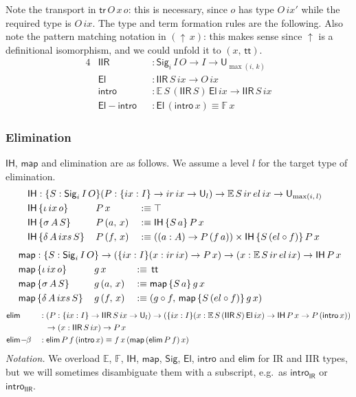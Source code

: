 \documentclass[acmsmall,screen,review]{acmart}
\newcommand{\msf}[1]{{\mathsf{#1}}}
\newcommand{\mbb}[1]{\mathbb{#1}}
\newcommand{\U}{\msf{U}}
\newcommand{\El}{\msf{El}}
\newcommand{\lup}{\uparrow}
\newcommand{\Sig}{\msf{Sig}}
\newcommand{\ttt}{\msf{tt}}
\newcommand{\ir}{{ir}}
\newcommand{\el}{{el}}
\newcommand{\ix}{{ix}}
\newcommand{\ixs}{{ixs}}
\newcommand{\IR}{\msf{IR}}
\newcommand{\intro}{\msf{intro}}
\newcommand{\IH}{\msf{IH}}
\newcommand{\map}{\msf{map}}
\newcommand{\elim}{\msf{elim}}
\newcommand{\tr}{\msf{tr}}
\newcommand{\IIR}{\msf{IIR}}
\newcommand{\E}{\mbb{E}}
\newcommand{\F}{\mbb{F}}
\begin{document}
Note the transport in $\tr\,O\,x\,o$: this is necessary, since $o$ has type $O\,\ix'$ while the
required type is $O\,\ix$. The type and term formation rules are the following. Also note the pattern matching notation
in $(\lup\,x)$: this makes sense since $\lup$ is a definitional isomorphism, and we could unfold it to $(x,\,\ttt)$.
\begin{alignat*}{4}
  &\IIR               && : \Sig_i\,I\,O \to I \to \U_{\max(i,\,k)}\\
  &\El                && : \IIR\,S\,\ix \to O\,\ix\\
  &\intro             && : \E\,S\,(\IIR\,S)\,\El\,\ix \to \IIR\,S\,\ix\\
  &\msf{El\!\!-\!\!intro} && : \El\,(\intro\,x) \equiv \F\,x
\end{alignat*}
\subsubsection{Elimination}\label{sec:iir-elimination} $\IH$, $\map$ and elimination are
as follows. We assume a level $l$ for the target type of elimination.
\begin{alignat*}{3}
  &\rlap{$\IH : \{S : \Sig_i\,I\,O\}(P : \{\ix : I\}\to \ir\,\ix \to \U_l) \to \E\,S\,\ir\,\el\,\ix \to \U_{\max(i,\,l)}$} \\
  &\IH\,\{\iota\,\ix\,o      \}\,&&P\,x       &&:\equiv \top \\
  &\IH\,\{\sigma\,A\,S     \}\,&&P\,(a,\,x) &&:\equiv \IH\,\{S\,a\}\,P\,x \\
  &\IH\,\{\delta\,A\,\ixs\,S\}\,&&P\,(f,\,x) &&:\equiv ((a : A) \to P\,(f\,a)) \times \IH\,\{S\,(\el \circ f)\}\,P\,x
\end{alignat*}
\begin{alignat*}{3}
  &\hspace{-7em}\rlap{$\map : \{S : \Sig_i\,I\,O\} \to (\{\ix : I\}(x : \ir\,\ix) \to P\,x) \to (x : \E\,S\,\ir\,\el\,\ix) \to \IH\,P\,x$} \\
  &\hspace{-7em}\map\,\{\iota\,\ix\,o\}\,&&g\,x       &&:\equiv\,\ttt \\
  &\hspace{-7em}\map\,\{\sigma\,A\,S\}\,&&g\,(a,\,x) &&:\equiv \map\,\{S\,a\}\,g\,x \\
  &\hspace{-7em}\map\,\{\delta\,A\,\ixs\,S\}\,&&g\,(f,\,x) &&:\equiv (g \circ f,\,\map\,\{S\,(\el \circ f)\}\,g\,x)
\end{alignat*}
\begin{alignat*}{3}
  &\elim           &&: (P : \{\ix : I\}\to \IIR\,S\,\ix \to \U_l) \to (\{\ix : I\}(x : \E\,S\,(\IIR\,S)\,\El\,\ix) \to \IH\,P\,x \to P\,(\intro\,x))\\
  &                && \hspace{0.7em}\to (x : \IIR\,S\,\ix) \to P\,x \\
  &\elim\!-\!\!\beta &&: \elim\,P\,f\,(\intro\,x) \equiv f\,x\,(\map\,(\elim\,P\,f)\,x)
\end{alignat*}
\emph{Notation.} We overload $\E$, $\F$, $\IH$, $\map$, $\Sig$, $\El$, $\intro$ and $\elim$ for IR and IIR types, but we will sometimes disambiguate them
with a subscript, e.g.\ as $\intro_\IR$ or $\intro_\IIR$.
\end{document}
